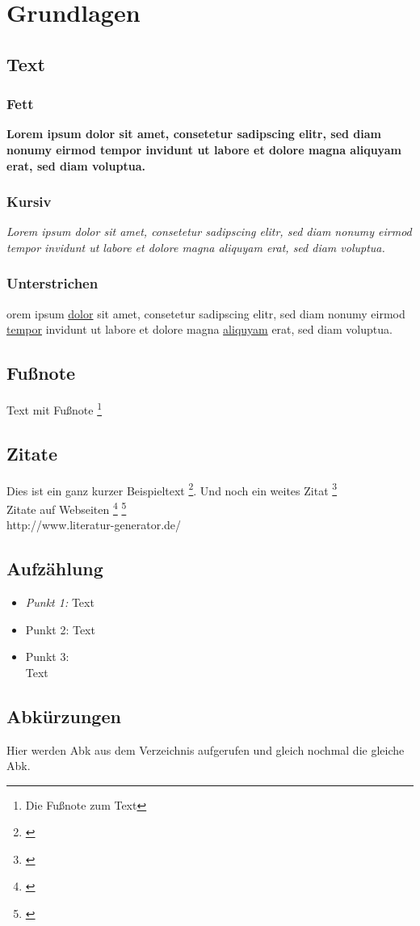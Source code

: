 \chapter{Grundlagen}
\section{Text}

\subsection{Fett}
\textbf{Lorem ipsum dolor sit amet, consetetur sadipscing elitr, sed diam nonumy eirmod tempor invidunt ut labore et dolore magna aliquyam erat, sed diam voluptua.}

\subsection{Kursiv}
\textit{Lorem ipsum dolor sit amet, consetetur sadipscing elitr, sed diam nonumy eirmod tempor invidunt ut labore et dolore magna aliquyam erat, sed diam voluptua.}

\subsection{Unterstrichen}
orem ipsum \underline{dolor} sit amet, consetetur sadipscing elitr, sed diam nonumy eirmod \underline{tempor} invidunt ut labore et dolore magna \underline{aliquyam} erat, sed diam voluptua.

\section{Fußnote}

Text mit Fußnote \footnote{Die Fußnote zum Text} 

\section{Zitate}

Dies ist ein ganz kurzer Beispieltext \footnote{\cite{Baeumle-Courth2004}}. Und noch ein weites Zitat \footnote{\cite{Torvalds2001}}
\\
Zitate auf Webseiten \footnote{\cite{gabler:individualsoftware}} \footnote{\cite{gabler:standardsoftware}}
\\
http://www.literatur-generator.de/

\section{Aufzählung}

\begin{itemize}
\item\textit{Punkt 1:} Text
\item Punkt 2: Text
\item Punkt 3: \\ Text
\end{itemize}

\section{Abkürzungen}
Hier werden \ac{Abk} aus dem Verzeichnis aufgerufen und gleich nochmal die gleiche \ac{Abk}.